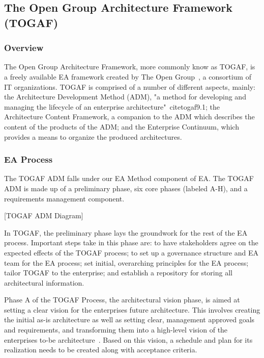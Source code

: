 \subsection{The Open Group Architecture Framework (TOGAF)}

\subsubsection{Overview}
The Open Group Architecture Framework, more commonly know as TOGAF, is a freely available EA framework created by The Open Group~\cite{togaf9.1}, a consortium of IT organizations. TOGAF is comprised of a number of different aspects, mainly: the Architecture Development Method (ADM), "a method for developing and managing the lifecycle of an enterprise architecture"~cite{togaf9.1}; the Architecture Content Framework, a companion to the ADM which describes the content of the products of the ADM; and the Enterprise Continuum, which provides a means to organize the produced architectures. 

%
%

\subsubsection{EA Process}
The TOGAF ADM falls under our EA Method component of EA. The TOGAF ADM is made up of a preliminary phase, six core phases (labeled A-H), and a requirements management component. 

[TOGAF ADM Diagram]

In TOGAF, the preliminary phase lays the groundwork for the rest of the EA process. Important steps take in this phase are: to have stakeholders agree on the expected effects of the TOGAF process; to set up a governance structure and EA team for the EA process; set initial, overarching principles for the EA process; tailor TOGAF to the enterprise; and establish a repository for storing all architectural information.~\cite{togaf9.1}

Phase A of the TOGAF Process, the architectural vision phase, is aimed at setting a clear vision for the enterprises future architecture. This involves creating the initial as-is architecture as well as setting clear, management approved goals and requirements, and transforming them into a high-level vision of the enterprises to-be architecture~\cite{togaf9.1}. Based on this vision, a schedule and plan for its realization needs to be created along with acceptance criteria. 

